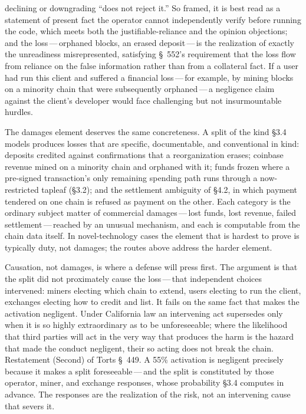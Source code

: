 \documentclass[11pt, twoside, openright]{book}
\newcommand{\sect}[1]{\S#1}
\begin{document}
declining or downgrading ``does not reject it.'' So framed, it is best read as a statement of present fact the operator cannot independently verify before running the code, which meets both the justifiable-reliance and the opinion objections; and the loss\,---\,orphaned blocks, an erased deposit\,---\,is the realization of exactly the unreadiness misrepresented, satisfying \S~552's requirement that the loss flow from reliance on the false information rather than from a collateral fact. If a user had run this client and suffered a financial loss\,---\,for example, by mining blocks on a minority chain that were subsequently orphaned\,---\,a negligence claim against the client's developer would face challenging but not insurmountable hurdles.

The damages element deserves the same concreteness. A split of the kind \sect{3.4} models produces losses that are specific, documentable, and conventional in kind: deposits credited against confirmations that a reorganization erases; coinbase revenue mined on a minority chain and orphaned with it; funds frozen where a pre-signed transaction's only remaining spending path runs through a now-restricted tapleaf (\sect{3.2}); and the settlement ambiguity of \sect{4.2}, in which payment tendered on one chain is refused as payment on the other. Each category is the ordinary subject matter of commercial damages\,---\,lost funds, lost revenue, failed settlement\,---\,reached by an unusual mechanism, and each is computable from the chain data itself. In novel-technology cases the element that is hardest to prove is typically duty, not damages; the routes above address the harder element.

Causation, not damages, is where a defense will press first. The argument is that the split did not proximately cause the loss\,---\,that independent choices intervened: miners electing which chain to extend, users electing to run the client, exchanges electing how to credit and list. It fails on the same fact that makes the activation negligent. Under California law an intervening act supersedes only when it is so highly extraordinary as to be unforeseeable; where the likelihood that third parties will act in the very way that produces the harm is the hazard that made the conduct negligent, their so acting does not break the chain. Restatement (Second) of Torts \S~449. A 55\% activation is negligent precisely because it makes a split foreseeable\,---\,and the split is constituted by those operator, miner, and exchange responses, whose probability \sect{3.4} computes in advance. The responses are the realization of the risk, not an intervening cause that severs it.
\end{document}

